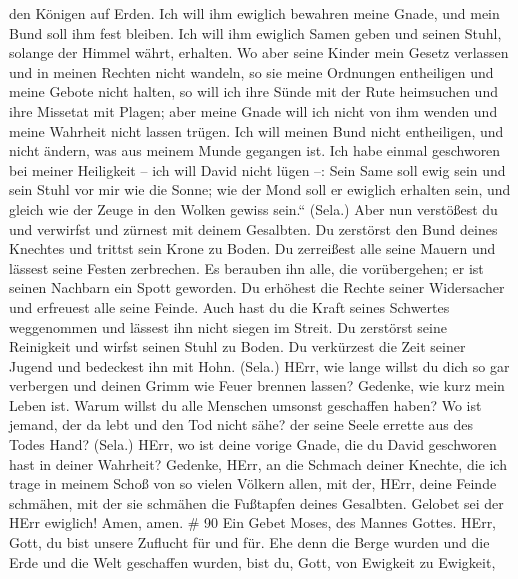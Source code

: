 den Königen auf Erden.  Ich will ihm ewiglich bewahren
meine Gnade, und mein Bund soll ihm fest bleiben.  Ich will
ihm ewiglich Samen geben und seinen Stuhl, solange der Himmel währt,
erhalten.  Wo aber seine Kinder mein Gesetz verlassen und
in meinen Rechten nicht wandeln,  so sie meine Ordnungen
entheiligen und meine Gebote nicht halten,  so will ich
ihre Sünde mit der Rute heimsuchen und ihre Missetat mit Plagen;
 aber meine Gnade will ich nicht von ihm wenden und meine
Wahrheit nicht lassen trügen.  Ich will meinen Bund nicht
entheiligen, und nicht ändern, was aus meinem Munde gegangen ist.
 Ich habe einmal geschworen bei meiner Heiligkeit -- ich
will David nicht lügen --:  Sein Same soll ewig sein und
sein Stuhl vor mir wie die Sonne;  wie der Mond soll er
ewiglich erhalten sein, und gleich wie der Zeuge in den Wolken gewiss
sein.`` (Sela.)  Aber nun verstößest du und verwirfst und
zürnest mit deinem Gesalbten.  Du zerstörst den Bund deines
Knechtes und trittst sein Krone zu Boden.  Du zerreißest
alle seine Mauern und lässest seine Festen zerbrechen.  Es
berauben ihn alle, die vorübergehen; er ist seinen Nachbarn ein Spott
geworden.  Du erhöhest die Rechte seiner Widersacher und
erfreuest alle seine Feinde.  Auch hast du die Kraft seines
Schwertes weggenommen und lässest ihn nicht siegen im Streit.
 Du zerstörst seine Reinigkeit und wirfst seinen Stuhl zu
Boden.  Du verkürzest die Zeit seiner Jugend und bedeckest
ihn mit Hohn. (Sela.)  HErr, wie lange willst du dich so
gar verbergen und deinen Grimm wie Feuer brennen lassen? 
Gedenke, wie kurz mein Leben ist. Warum willst du alle Menschen umsonst
geschaffen haben?  Wo ist jemand, der da lebt und den Tod
nicht sähe? der seine Seele errette aus des Todes Hand? (Sela.)
 HErr, wo ist deine vorige Gnade, die du David geschworen
hast in deiner Wahrheit?  Gedenke, HErr, an die Schmach
deiner Knechte, die ich trage in meinem Schoß von so vielen Völkern
allen,  mit der, HErr, deine Feinde schmähen, mit der sie
schmähen die Fußtapfen deines Gesalbten.  Gelobet sei der
HErr ewiglich! Amen, amen. \# 90  Ein Gebet Moses, des
Mannes Gottes. HErr, Gott, du bist unsere Zuflucht für und für.
 Ehe denn die Berge wurden und die Erde und die Welt
geschaffen wurden, bist du, Gott, von Ewigkeit zu Ewigkeit, 
